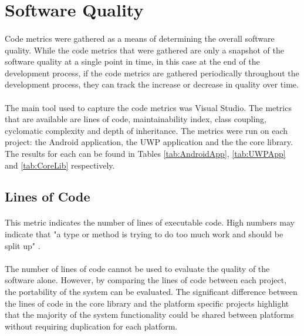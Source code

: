 \section{Software Quality}{
	\label{sec:Quality}
	\paragraph{}{
	Code metrics were gathered as a means of determining the overall software quality. While the code metrics that were gathered are only a snapshot of the software quality at a single point in time, in this case at the end of the development process, if the code metrics are gathered periodically throughout the development process, they can track the increase or decrease in quality over time.
	}
	\paragraph{}{
	The main tool used to capture the code metrics was Visual Studio. The metrics that are available are lines of code, maintainability index, class coupling, cyclomatic complexity and depth of inheritance. The metrics were run on each project: the Android application, the UWP application and the the core library. The results for each can be found in Tables \ref{tab:AndroidApp}, \ref{tab:UWPApp} and \ref{tab:CoreLib} respectively.
	}
	
	\subsection*{Lines of Code}
		\paragraph{}{
		This metric indicates the number of lines of executable code. High numbers may indicate that "a type or method is trying to do too much work and should be split up" \cite{CodeMetrics}.
		}
		\paragraph{}{
		The number of lines of code cannot be used to evaluate the quality of the software alone. However,  by comparing the lines of code between each project, the portability of the system can be evaluated. The significant difference between the lines of code in the core library and the platform specific projects highlight that the majority of the system functionality could be shared between platforms without requiring duplication for each platform.
		}
		
}
